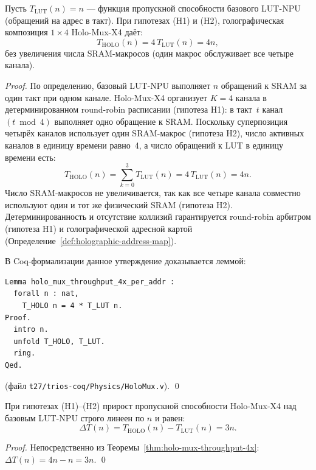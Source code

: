 \begin{theorem}
\label{thm:holo-mux-throughput-4x}
Пусть $T_{\mathrm{LUT}}(n) = n$ — функция пропускной способности
базового LUT-NPU (обращений на адрес в такт).
При гипотезах (H1) и (H2), голографическая композиция
$1\times 4$ Holo-Mux-X4 даёт:
\[
  T_{\mathrm{HOLO}}(n) = 4\,T_{\mathrm{LUT}}(n) = 4n,
\]
без увеличения числа SRAM-макросов (один макрос обслуживает все
четыре канала).
\end{theorem}

\begin{proof}
По определению, базовый LUT-NPU выполняет $n$ обращений к SRAM
за один такт при одном канале.  Holo-Mux-X4 организует $K = 4$
канала в детерминированном round-robin расписании (гипотеза H1):
в такт~$t$ канал $(t \bmod 4)$ выполняет одно обращение к SRAM.
Поскольку суперпозиция четырёх каналов использует один SRAM-макрос
(гипотеза H2), число активных каналов в единицу времени равно~4,
а число обращений к LUT в единицу времени есть:
\[
  T_{\mathrm{HOLO}}(n)
  = \sum_{k=0}^{3} T_{\mathrm{LUT}}(n)
  = 4\,T_{\mathrm{LUT}}(n)
  = 4n.
\]
Число SRAM-макросов не увеличивается, так как все четыре канала
совместно используют один и тот же физический SRAM (гипотеза H2).
Детерминированность и отсутствие коллизий гарантируется round-robin
арбитром (гипотеза H1) и голографической адресной картой
(Определение~\ref{def:holographic-address-map}).

В Coq-формализации данное утверждение доказывается леммой:
\begin{lstlisting}[language=Coq]
Lemma holo_mux_throughput_4x_per_addr :
  forall n : nat,
    T_HOLO n = 4 * T_LUT n.
Proof.
  intro n.
  unfold T_HOLO, T_LUT.
  ring.
Qed.
\end{lstlisting}
(файл \texttt{t27/trios-coq/Physics/HoloMux.v}).
\qed
\end{proof}

\begin{corollary}
\label{cor:linear-throughput-gain}
При гипотезах (H1)--(H2) прирост пропускной способности Holo-Mux-X4
над базовым LUT-NPU строго линеен по $n$ и равен:
\[
  \Delta T(n) = T_{\mathrm{HOLO}}(n) - T_{\mathrm{LUT}}(n) = 3n.
\]
\end{corollary}

\begin{proof}
Непосредственно из Теоремы~\ref{thm:holo-mux-throughput-4x}:
$\Delta T(n) = 4n - n = 3n$.
\qed
\end{proof}

